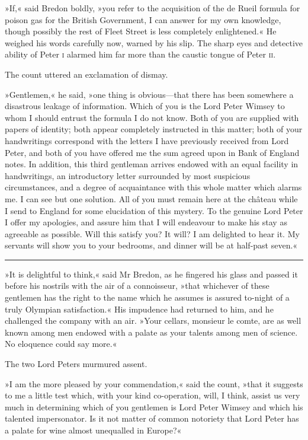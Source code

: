 »If,« said Bredon boldly, »you refer to the acquisition of the de Rueil formula for poison gas for the British Government, I can answer for my own knowledge, though possibly the rest of Fleet Street is less completely enlightened.« He weighed his words carefully now, warned by his slip. The sharp eyes and detective ability of Peter \textsc{i} alarmed him far more than the caustic tongue of Peter \textsc{ii}.

The count uttered an exclamation of dismay.

»Gentlemen,« he said, »one thing is obvious—that there has been somewhere a disastrous leakage of information. Which of you is the Lord Peter Wimsey to whom I should entrust the formula I do not know. Both of you are supplied with papers of identity; both appear completely instructed in this matter; both of your handwritings correspond with the letters I have previously received from Lord Peter, and both of you have offered me the sum agreed upon in Bank of England notes. In addition, this third gentleman arrives endowed with an equal facility in handwritings, an introductory letter surrounded by most suspicious circumstances, and a degree of acquaintance with this whole matter which alarms me. I can see but one solution. All of you must remain here at the château while I send to England for some elucidation of this mystery. To the genuine Lord Peter I offer my apologies, and assure him that I will endeavour to make his stay as agreeable as possible. Will this satisfy you? It will? I am delighted to hear it. My servants will show you to your bedrooms, and dinner will be at half-past seven.«

\noindent\hfil\rule{0.5\textwidth}{.4pt}\hfil 

»It is delightful to think,« said Mr Bredon, as he fingered his glass and passed it before his nostrils with the air of a connoisseur, »that whichever of these gentlemen has the right to the name which he assumes is assured to-night of a truly Olympian satisfaction.« His impudence had returned to him, and he challenged the company with an air. »Your cellars, monsieur le comte, are as well known among men endowed with a palate as your talents among men of science. No eloquence could say more.«

The two Lord Peters murmured assent.

»I am the more pleased by your commendation,« said the count, »that it suggests to me a little test which, with your kind co-operation, will, I think, assist us very much in determining which of you gentlemen is Lord Peter Wimsey and which his talented impersonator. Is it not matter of common notoriety that Lord Peter has a palate for wine almost unequalled in Europe?«

